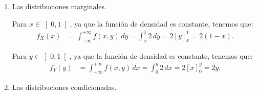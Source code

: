 \begin{ejercicio}
\begin{enumerate}
\begin{itemize}
            \item \ul{Si $x\in \left]0,1\right[$ \quad y \quad $y\geq 1$} (zona $R_4$):
            \begin{align*}
                F_{(X,Y)}(x, y) &= \int_{-\infty}^x \int_{-\infty}^y f(u, v) \, du \, dv = \int_{0}^{x} \int_{u}^{1} 2 \, dv \, du = \int_{0}^{x} 2(1-u) \, du
                =\\&= 2\left[u-\dfrac{u^2}{2}\right]_0^x = 2\left(x-\dfrac{x^2}{2}\right) = 2x-x^2.
            \end{align*}

            \item \ul{Si $x,y\geq 1$} (zona $R_5$):
            \begin{equation*}
                F_{(X,Y)}(x, y) = 1.
            \end{equation*}
        \end{itemize}

        Por tanto, tenemos que:
        \begin{equation*}
            F_{(X,Y)}(x, y) = \begin{cases}
                0, & x\leq 0 \text{ o } y\leq 0, (R_1), \\
                2xy-x^2, & x\in \left]0,1\right[ \text{ y } x<y<1, (R_2), \\
                y^2, & y\in \left]0,1\right[ \text{ y } x>y, (R_3), \\
                2x-x^2, & x\in \left]0,1\right[ \text{ y } y\geq 1, (R_4), \\
                1, & x,y\geq 1, (R_5).
            \end{cases}
        \end{equation*}
        \item Las distribuciones marginales.
        
        Para $x\in \left]0,1\right[$, ya que la función de densidad es constante, tenemos que:
        \begin{align*}
            f_X(x) &= \int_{-\infty}^{+\infty} f(x, y) \, dy = \int_{x}^{1} 2 \, dy = 2\left[y\right]_{x}^{1} = 2(1-x).
        \end{align*}

        Para $y\in \left]0,1\right[$, ya que la función de densidad es constante, tenemos que:
        \begin{align*}
            f_Y(y) &= \int_{-\infty}^{+\infty} f(x, y) \, dx = \int_{0}^{y} 2 \, dx = 2\left[x\right]_{0}^{y} = 2y.
        \end{align*}
        \item Las distribuciones condicionadas.
        

\end{enumerate}
\end{ejercicio}
